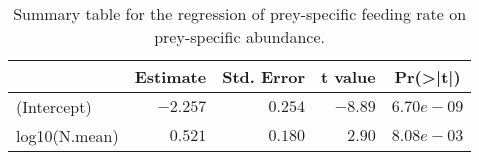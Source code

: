 \begin{table}[!htbp]
\caption{Summary table for the regression of 
  prey-specific feeding rate 
  on prey-specific abundance.\label{tab:FN}} 
\begin{center}
\begin{tabular}{lrrrr}
\hline
\multicolumn{1}{l}{}&\multicolumn{1}{c}{Estimate}&\multicolumn{1}{c}{Std. Error}&\multicolumn{1}{c}{t value}&\multicolumn{1}{c}{Pr(\textgreater |t|)}\tabularnewline
\hline
(Intercept)&$-2.257$&$0.254$&$-8.89$&$6.70e-09$\tabularnewline
log10(N.mean)&$ 0.521$&$0.180$&$ 2.90$&$8.08e-03$\tabularnewline
\hline
\end{tabular}\end{center}
\end{table}
